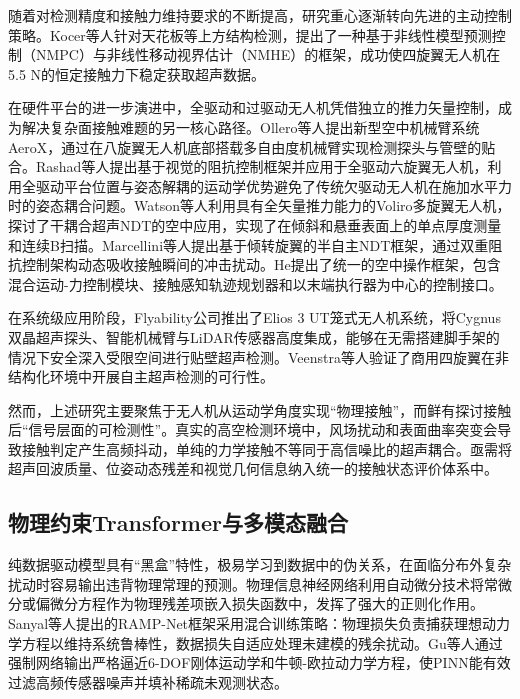 随着对检测精度和接触力维持要求的不断提高，研究重心逐渐转向先进的主动控制策略。Kocer等人针对天花板等上方结构检测，提出了一种基于非线性模型预测控制（NMPC）与非线性移动视界估计（NMHE）的框架，成功使四旋翼无人机在5.5 N的恒定接触力下稳定获取超声数据。

在硬件平台的进一步演进中，全驱动和过驱动无人机凭借独立的推力矢量控制，成为解决复杂面接触难题的另一核心路径。Ollero等人提出新型空中机械臂系统AeroX，通过在八旋翼无人机底部搭载多自由度机械臂实现检测探头与管壁的贴合。Rashad等人提出基于视觉的阻抗控制框架并应用于全驱动六旋翼无人机，利用全驱动平台位置与姿态解耦的运动学优势避免了传统欠驱动无人机在施加水平力时的姿态耦合问题。Watson等人利用具有全矢量推力能力的Voliro多旋翼无人机，探讨了干耦合超声NDT的空中应用，实现了在倾斜和悬垂表面上的单点厚度测量和连续B扫描。Marcellini等人提出基于倾转旋翼的半自主NDT框架，通过双重阻抗控制架构动态吸收接触瞬间的冲击扰动。He提出了统一的空中操作框架，包含混合运动-力控制模块、接触感知轨迹规划器和以末端执行器为中心的控制接口。

在系统级应用阶段，Flyability公司推出了Elios 3 UT笼式无人机系统，将Cygnus双晶超声探头、智能机械臂与LiDAR传感器高度集成，能够在无需搭建脚手架的情况下安全深入受限空间进行贴壁超声检测。Veenstra等人验证了商用四旋翼在非结构化环境中开展自主超声检测的可行性。

然而，上述研究主要聚焦于无人机从运动学角度实现“物理接触”，而鲜有探讨接触后“信号层面的可检测性”。真实的高空检测环境中，风场扰动和表面曲率突变会导致接触判定产生高频抖动，单纯的力学接触不等同于高信噪比的超声耦合。亟需将超声回波质量、位姿动态残差和视觉几何信息纳入统一的接触状态评价体系中。

\subsection{物理约束Transformer与多模态融合}

纯数据驱动模型具有“黑盒”特性，极易学习到数据中的伪关系，在面临分布外复杂扰动时容易输出违背物理常理的预测。物理信息神经网络利用自动微分技术将常微分或偏微分方程作为物理残差项嵌入损失函数中，发挥了强大的正则化作用。Sanyal等人提出的RAMP-Net框架采用混合训练策略：物理损失负责捕获理想动力学方程以维持系统鲁棒性，数据损失自适应处理未建模的残余扰动。Gu等人通过强制网络输出严格逼近6-DOF刚体运动学和牛顿-欧拉动力学方程，使PINN能有效过滤高频传感器噪声并填补稀疏未观测状态。

